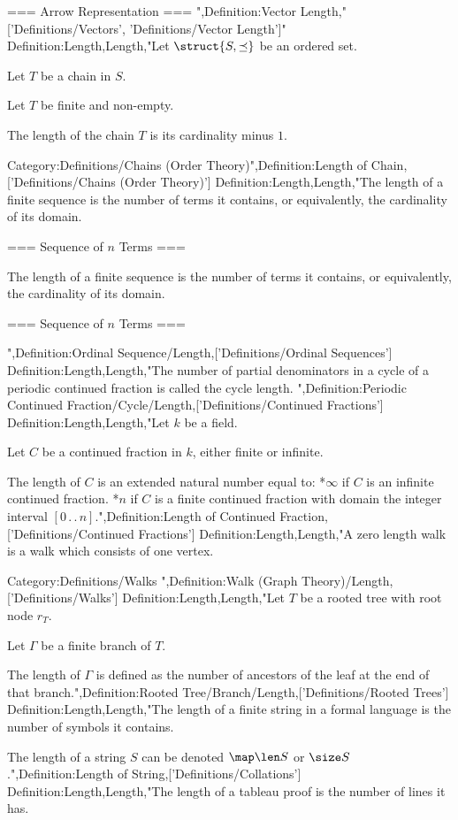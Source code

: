 === Arrow Representation ===
",Definition:Vector Length,"['Definitions/Vectors', 'Definitions/Vector Length']"
Definition:Length,Length,"Let $\struct {S, \preceq}$ be an ordered set.

Let $T$ be a chain in $S$.

Let $T$ be finite and non-empty.


The length of the chain $T$ is its cardinality minus $1$.


Category:Definitions/Chains (Order Theory)",Definition:Length of Chain,['Definitions/Chains (Order Theory)']
Definition:Length,Length,"The length of a finite sequence is the number of terms it contains, or equivalently, the cardinality of its domain.


=== Sequence of $n$ Terms ===

The length of a finite sequence is the number of terms it contains, or equivalently, the cardinality of its domain.


=== Sequence of $n$ Terms ===

",Definition:Ordinal Sequence/Length,['Definitions/Ordinal Sequences']
Definition:Length,Length,"The number of partial denominators in a cycle of a periodic continued fraction is called the cycle length.
",Definition:Periodic Continued Fraction/Cycle/Length,['Definitions/Continued Fractions']
Definition:Length,Length,"Let $k$ be a field.

Let $C$ be a continued fraction in $k$, either finite or infinite.


The length of $C$ is an extended natural number equal to:
*$\infty$ if $C$ is an infinite continued fraction.
*$n$ if $C$ is a finite continued fraction with domain the integer interval $\left[0 \,.\,.\, n\right]$.",Definition:Length of Continued Fraction,['Definitions/Continued Fractions']
Definition:Length,Length,"A zero length walk is a walk which consists of one vertex.


Category:Definitions/Walks
",Definition:Walk (Graph Theory)/Length,['Definitions/Walks']
Definition:Length,Length,"Let $T$ be a rooted tree with root node $r_T$.

Let $\Gamma$ be a finite branch of $T$.


The length of $\Gamma$ is defined as the number of ancestors of the leaf at the end of that branch.",Definition:Rooted Tree/Branch/Length,['Definitions/Rooted Trees']
Definition:Length,Length,"The length of a finite string in a formal language is the number of symbols it contains.


The length of a string $S$ can be denoted $\map \len S$ or $\size S$.",Definition:Length of String,['Definitions/Collations']
Definition:Length,Length,"The length of a tableau proof is the number of lines it has.


